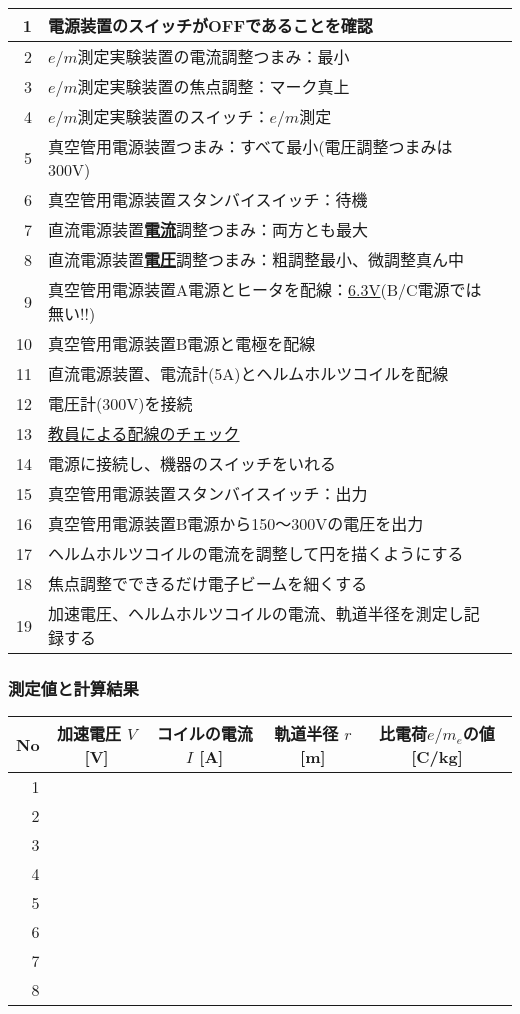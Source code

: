 \begin{tabular}{|r|p{14cm}|p{0.7cm}|}
\hline
1 & 電源装置のスイッチがOFFであることを確認 & \\
\hline
2 & $e/m$測定実験装置の電流調整つまみ：最小 & \\
\hline
3 & $e/m$測定実験装置の焦点調整：マーク真上& \\
\hline
4 & $e/m$測定実験装置のスイッチ：$e/m$測定 & \\
\hline
5 &  真空管用電源装置つまみ：すべて最小(電圧調整つまみは300V) & \\
\hline
6 & 真空管用電源装置スタンバイスイッチ：待機 & \\
\hline
7 & 直流電源装置\underline{\bf 電流}調整つまみ：両方とも最大 & \\
\hline
8 & 直流電源装置\underline{\bf 電圧}調整つまみ：粗調整最小、微調整真ん中 &\\
\hline
9 & 真空管用電源装置A電源とヒータを配線：\underline{6.3V}(B/C電源では無い!!) & \\
\hline
10 & 真空管用電源装置B電源と電極を配線 & \\
\hline
11 & 直流電源装置、電流計(5A)とヘルムホルツコイルを配線 & \\ 
\hline
12 & 電圧計(300V)を接続 & \\
\hline
13 & \underline{教員による配線のチェック} &\\
\hline\hline
14 & 電源に接続し、機器のスイッチをいれる &\\
\hline
15 & 真空管用電源装置スタンバイスイッチ：出力 & \\ 
\hline
16 & 真空管用電源装置B電源から150〜300Vの電圧を出力  & \\
\hline
17 & ヘルムホルツコイルの電流を調整して円を描くようにする  & \\
\hline
18 & 焦点調整でできるだけ電子ビームを細くする  & \\
\hline
19 & 加速電圧、ヘルムホルツコイルの電流、軌道半径を測定し記録する  & \\
\hline
\end{tabular}


\subsubsection*{測定値と計算結果}

\hspace*{-\parindent}
\begin{tabular}{|r|c|c|c|c|}
\hline
No & 加速電圧 $V$ [V] & コイルの電流 $I$ [A] & 軌道半径 $r$ [m] & 比電荷$e/m_e$の値 [C/kg] \\
\hline\hline
1&&&&\\
\hline
2&&&&\\
\hline
3&&&&\\
\hline
4&&&&\\
\hline
5&&&&\\
\hline
6&&&&\\
\hline
7&&&&\\
\hline
8&&&&\\
\hline
\end{tabular}

